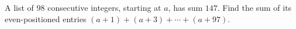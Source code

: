 A list of $98$ consecutive integers, starting at $a$, has sum $147$. Find the sum of its even-positioned entries $(a+1)+(a+3)+\cdots+(a+97)$.
